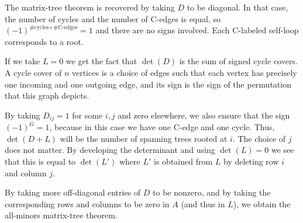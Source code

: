 \documentclass[a4paper, 11pt]{article}
\theoremstyle{definition}
\begin{document}
The matrix-tree theorem is recovered by taking $D$ to be diagonal. In that case, the number of cycles and the number of C-edges is equal, so $(-1)^{\text{\#cycles} + \text{\#C-edges}} = 1$ and there are no signs involved. Each C-labeled self-loop corresponds to a root.

If we take $L=0$ we get the fact that $\det(D)$ is the sum of signed cycle covers. A cycle cover of $n$ vertices is a choice of edges such that each vertex has precisely one incoming and one outgoing edge, and its sign is the sign of the permutation that this graph depicts.

By taking $D_{ij} = 1$ for some $i,j$ and zero elsewhere, we also ensure that the sign $(-1)^G = 1$, because in this case we have one C-edge and one cycle. Thus, $\det(D+L)$ will be the number of spanning trees rooted at $i$. The choice of $j$ does not matter. By developing the determinant and using $\det(L) = 0$ we see that this is equal to $\det(L')$ where $L'$ is obtained from $L$ by deleting row $i$ and column $j$.

By taking more off-diagonal entries of $D$ to be nonzero, and by taking the corresponding rows and columns to be zero in $A$ (and thus in $L$), we obtain the all-minors matrix-tree theorem.
\end{document}
